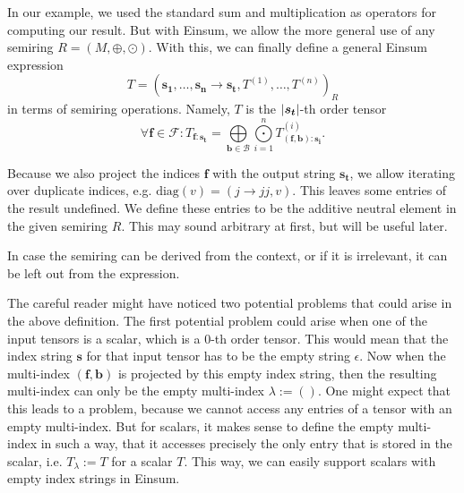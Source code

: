 \begin{definition}
    In our example, we used the standard sum and multiplication as operators for computing our result.
    But with Einsum, we allow the more general use of any semiring $R = (M, \oplus, \odot)$.
    With this, we can finally define a general Einsum expression
    $$T = (\bm{s_1},\dots,\bm{s_n} \rightarrow \bm{s_t}, T^{(1)},\dots,T^{(n)})_R$$
    in terms of semiring operations. Namely, $T$ is the $\left\lvert \bm{s_t} \right\rvert$-th order tensor
    $$\forall \bm{f} \in \mathcal{F}: T_{\bm{f}: \bm{s_t}} = \bigoplus\limits_{\bm{b} \in \mathcal{B}} \bigodot\limits_{i = 1}^{n} T^{(i)}_{(\bm{f},\bm{b}):\bm{s_i}}.$$

    Because we also project the indices $\bm{f}$ with the output string $\bm{s_t}$, we allow iterating over duplicate indices,
    e.g. $\text{diag}(v) = (j \rightarrow jj, v)$.
    This leaves some entries of the result undefined.
    We define these entries to be the additive neutral element in the given semiring $R$.
    This may sound arbitrary at first, but will be useful later.

    In case the semiring can be derived from the context, or if it is irrelevant, it can be left out from the expression.


\end{definition}
\bigskip

The careful reader might have noticed two potential problems that could arise in the above definition.
The first potential problem could arise when one of the input tensors is a scalar, which is a 0-th order tensor.
This would mean that the index string $\bm{s}$ for that input tensor has to be the empty string $\epsilon$.
Now when the multi-index $(\bm{f}, \bm{b})$ is projected by this empty index string, then the resulting multi-index can only be the empty multi-index $\lambda := ()$.
One might expect that this leads to a problem, because we cannot access any entries of a tensor with an empty multi-index.
But for scalars, it makes sense to define the empty multi-index in such a way, that it accesses precisely the only entry that is stored in the scalar, i.e. $T_\lambda := T$ for a scalar $T$.
This way, we can easily support scalars with empty index strings in Einsum.

